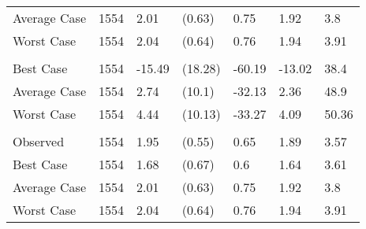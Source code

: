 \begin{tabular}[t]{lllllll}
\hspace{1em}\hspace{1em}Average Case & 1554 & 2.01 & (0.63) & 0.75 & 1.92 & \vphantom{1} 3.8\\
\hspace{1em}Worst Case & 1554 & 2.04 & (0.64) & 0.76 & 1.94 & \vphantom{1} 3.91\\
\addlinespace[0.3em]
\multicolumn{7}{l}{\textbf{\% Change Average Price}}\\
\hspace{1em}Best Case & 1554 & -15.49 & (18.28) & -60.19 & -13.02 & 38.4\\
\hspace{1em}Average Case & 1554 & 2.74 & (10.1) & -32.13 & 2.36 & 48.9\\
\hspace{1em}Worst Case & 1554 & 4.44 & (10.13) & -33.27 & 4.09 & 50.36\\
\addlinespace[0.3em]
\multicolumn{7}{l}{\textbf{Median Price}}\\
\hspace{1em}Observed & 1554 & 1.95 & (0.55) & 0.65 & 1.89 & 3.57\\
\hspace{1em}Best Case & 1554 & 1.68 & (0.67) & 0.6 & 1.64 & 3.61\\
\hspace{1em}Average Case & 1554 & 2.01 & (0.63) & 0.75 & 1.92 & 3.8\\
\hspace{1em}Worst Case & 1554 & 2.04 & (0.64) & 0.76 & 1.94 & 3.91\\
\bottomrule
\end{tabular}
